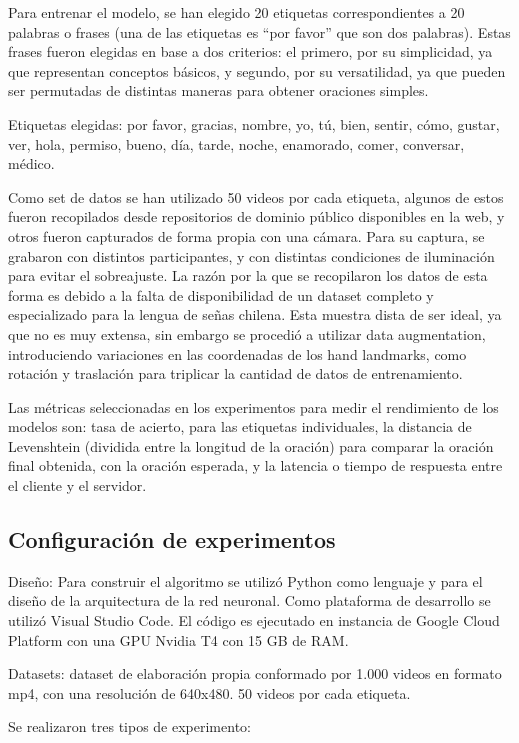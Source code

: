 \documentclass{article}
\begin{document}
Para entrenar el modelo, se han elegido 20 etiquetas correspondientes a 20 palabras o frases (una de las etiquetas es “por favor” que son dos palabras). Estas frases fueron elegidas en base a dos criterios: el primero, por su simplicidad, ya que representan conceptos básicos, y segundo, por su versatilidad, ya que pueden ser permutadas de distintas maneras para obtener oraciones simples.

Etiquetas elegidas: por favor, gracias, nombre, yo, tú, bien, sentir, cómo, gustar, ver, hola, permiso, bueno, día, tarde, noche, enamorado, comer, conversar, médico.

Como set de datos se han utilizado 50 videos por cada etiqueta, algunos de estos fueron recopilados desde repositorios de dominio público disponibles en la web, y otros fueron capturados de forma propia con una cámara. Para su captura, se grabaron con distintos participantes, y con distintas condiciones de iluminación para evitar el sobreajuste. 
La razón por la que se recopilaron los datos de esta forma es debido a la falta de disponibilidad de un dataset completo y especializado para la lengua de señas chilena.  Esta muestra dista de ser ideal, ya que no es muy extensa, sin embargo se procedió a utilizar data augmentation, introduciendo variaciones en las coordenadas de los hand landmarks, como rotación y traslación para triplicar la cantidad de datos de entrenamiento.

Las métricas seleccionadas en los experimentos para medir el rendimiento de los modelos son: tasa de acierto, para las etiquetas individuales, la distancia de Levenshtein (dividida entre la longitud de la oración) para comparar la oración final obtenida, con la oración esperada, y la latencia o tiempo de respuesta entre el cliente y el servidor.
\subsection{ Configuración de experimentos}

Diseño: Para construir el algoritmo se utilizó Python como lenguaje y para el diseño de la arquitectura de la red neuronal. Como plataforma de desarrollo se utilizó Visual Studio Code.
El código es ejecutado en instancia de Google Cloud Platform con una GPU Nvidia T4 con 15 GB de RAM.

Datasets: dataset de elaboración propia  conformado por 1.000 videos en formato mp4, con una resolución de 640x480. 50 videos por cada etiqueta.

Se realizaron tres tipos de experimento: 
\end{document}
